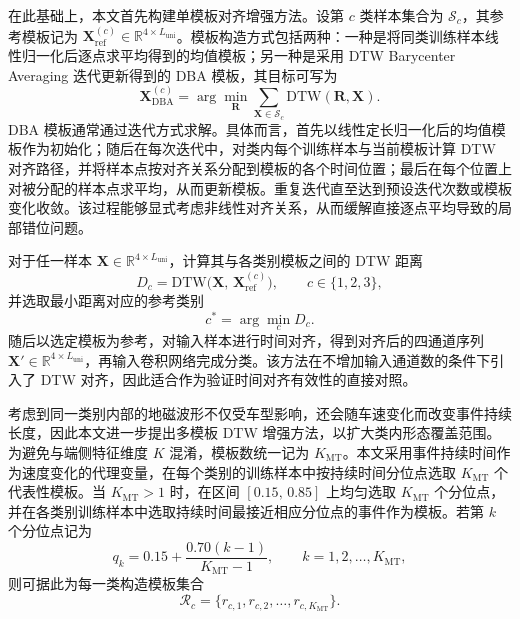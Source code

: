 在此基础上，本文首先构建单模板对齐增强方法。设第 $c$ 类样本集合为 $\mathcal{S}_c$，其参考模板记为 $\mathbf{X}_{\mathrm{ref}}^{(c)}\in\mathbb{R}^{4\times L_{\mathrm{uni}}}$。模板构造方式包括两种：一种是将同类训练样本线性归一化后逐点求平均得到的均值模板；另一种是采用 DTW Barycenter Averaging 迭代更新得到的 DBA 模板\cite{ch3_petitjean2011dba}，其目标可写为
\begin{equation}
    \mathbf{X}_{\mathrm{DBA}}^{(c)}=\arg\min_{\mathbf{R}}\sum_{\mathbf{X}\in\mathcal{S}_c}\mathrm{DTW}(\mathbf{R},\mathbf{X}).
\end{equation}
DBA 模板通常通过迭代方式求解。具体而言，首先以线性定长归一化后的均值模板作为初始化；随后在每次迭代中，对类内每个训练样本与当前模板计算 DTW 对齐路径，并将样本点按对齐关系分配到模板的各个时间位置；最后在每个位置上对被分配的样本点求平均，从而更新模板。重复迭代直至达到预设迭代次数或模板变化收敛。该过程能够显式考虑非线性对齐关系，从而缓解直接逐点平均导致的局部错位问题。

对于任一样本 $\mathbf{X}\in\mathbb{R}^{4\times L_{\mathrm{uni}}}$，计算其与各类别模板之间的 DTW 距离
\begin{equation}
    D_c=\mathrm{DTW}\big(\mathbf{X},\,\mathbf{X}_{\mathrm{ref}}^{(c)}\big),\qquad c\in\{1,2,3\},
\end{equation}
并选取最小距离对应的参考类别
\begin{equation}
    c^\ast=\arg\min_c D_c.
\end{equation}
随后以选定模板为参考，对输入样本进行时间对齐，得到对齐后的四通道序列 $\mathbf{X}'\in\mathbb{R}^{4\times L_{\mathrm{uni}}}$，再输入卷积网络完成分类。该方法在不增加输入通道数的条件下引入了 DTW 对齐，因此适合作为验证时间对齐有效性的直接对照。

考虑到同一类别内部的地磁波形不仅受车型影响，还会随车速变化而改变事件持续长度，因此本文进一步提出多模板 DTW 增强方法，以扩大类内形态覆盖范围。为避免与端侧特征维度 $K$ 混淆，模板数统一记为 $K_{\mathrm{MT}}$。本文采用事件持续时间作为速度变化的代理变量，在每个类别的训练样本中按持续时间分位点选取 $K_{\mathrm{MT}}$ 个代表性模板。当 $K_{\mathrm{MT}}>1$ 时，在区间 $[0.15,\,0.85]$ 上均匀选取 $K_{\mathrm{MT}}$ 个分位点，并在各类别训练样本中选取持续时间最接近相应分位点的事件作为模板。若第 $k$ 个分位点记为
\begin{equation}
    q_k=0.15+\frac{0.70(k-1)}{K_{\mathrm{MT}}-1},\qquad k=1,2,\ldots,K_{\mathrm{MT}},
\end{equation}
则可据此为每一类构造模板集合
\begin{equation}
    \mathcal{R}_c=\{r_{c,1},r_{c,2},\ldots,r_{c,K_{\mathrm{MT}}}\}.
\end{equation}

